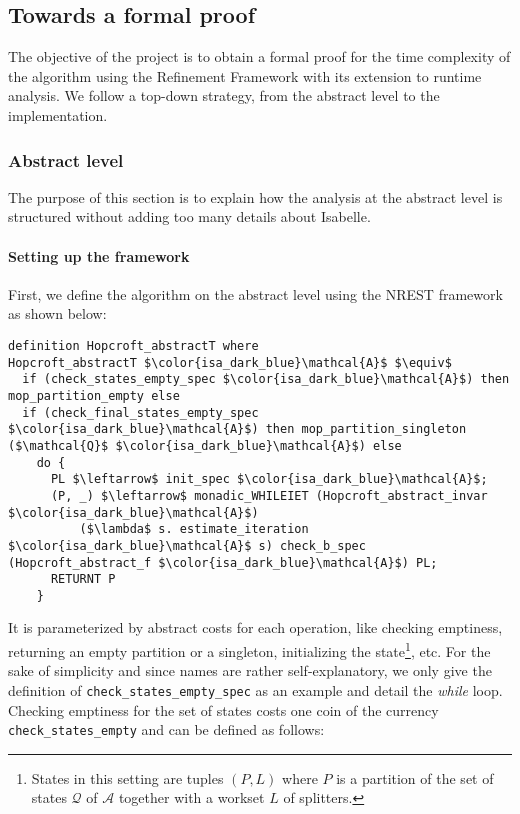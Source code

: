 \documentclass[12pt, a4 paper]{article}
\theoremstyle{definition}
\begin{document}
\subsection{Towards a formal proof}
The objective of the project is to obtain a formal proof for the time complexity of the algorithm using the Refinement Framework with its extension to runtime analysis.
We follow a top-down strategy, from the abstract level to the implementation.

\subsubsection{Abstract level}

The purpose of this section is to explain how the analysis at the abstract level is structured without adding too many details about Isabelle.

\paragraph{Setting up the framework}
First, we define the algorithm on the abstract level using the NREST framework as shown below:

\noindent
\begin{minipage}{\linewidth}
\begin{lstlisting}[language=Isabelle]
definition Hopcroft_abstractT where
Hopcroft_abstractT $\color{isa_dark_blue}\mathcal{A}$ $\equiv$
  if (check_states_empty_spec $\color{isa_dark_blue}\mathcal{A}$) then mop_partition_empty else 
  if (check_final_states_empty_spec $\color{isa_dark_blue}\mathcal{A}$) then mop_partition_singleton ($\mathcal{Q}$ $\color{isa_dark_blue}\mathcal{A}$) else
    do {
      PL $\leftarrow$ init_spec $\color{isa_dark_blue}\mathcal{A}$;
      (P, _) $\leftarrow$ monadic_WHILEIET (Hopcroft_abstract_invar $\color{isa_dark_blue}\mathcal{A}$) 
          ($\lambda$ s. estimate_iteration $\color{isa_dark_blue}\mathcal{A}$ s) check_b_spec (Hopcroft_abstract_f $\color{isa_dark_blue}\mathcal{A}$) PL;
      RETURNT P
    }
\end{lstlisting}
\end{minipage}

It is parameterized by abstract costs for each operation, like checking emptiness, returning an empty partition or a singleton, initializing the state\footnote{States in this setting are tuples $(P, L)$ where $P$ is a partition of the set of states $\mathcal{Q}$ of $\mathcal{A}$ together with a workset $L$ of splitters.}, etc.
For the sake of simplicity and since names are rather self-explanatory, we only give the definition of \texttt{check\_states\_empty\_spec} as an example and detail the \textit{while} loop. Checking emptiness for the set of states costs one coin of the currency \texttt{check\_states\_empty} and can be defined as follows:
\end{document}
